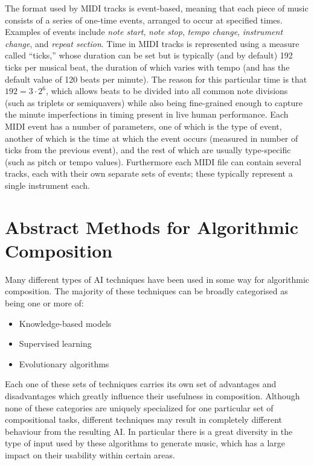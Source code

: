 \documentclass[ author={Stephen Livermore-Tozer},
				supervisor={Dr. Peter Flach},
				degree={MEng},
				title={Algorithmic Co-composition Using Machine Learning},
				subtitle={},
				type={research},
				year={2016} ]{dissertation}
\begin{document}
	
	The format used by MIDI tracks is event-based, meaning that each piece of music consists of a series of one-time events, arranged to occur at specified times. Examples of events include \textit{note start}, \textit{note stop}, \textit{tempo change}, \textit{instrument change}, and \textit{repeat section}. Time in MIDI tracks is represented using a measure called ``ticks,'' whose duration can be set but is typically (and by default) 192 ticks per musical beat, the duration of which varies with tempo (and has the default value of 120 beats per minute). The reason for this particular time is that $192 = 3 \cdot 2^6$, which allows beats to be divided into all common note divisions (such as triplets or semiquavers) while also being fine-grained enough to capture the minute imperfections in timing present in live human performance. Each MIDI event has a number of parameters, one of which is the type of event, another of which is the time at which the event occurs (measured in number of ticks from the previous event), and the rest of which are usually type-specific (such as pitch or tempo values). Furthermore each MIDI file can contain several tracks, each with their own separate sets of events; these typically represent a single instrument each. 
	
	\section{Abstract Methods for Algorithmic Composition}
	\label{sec:abstract-methods}
	
	Many different types of AI techniques have been used in some way for algorithmic composition. The majority of these techniques can be broadly categorised as being one or more of:
	\begin{itemize}
		\item Knowledge-based models
		\item Supervised learning
		\item Evolutionary algorithms
	\end{itemize}
	Each one of these sets of techniques carries its own set of advantages and disadvantages which greatly influence their usefulness in composition. Although none of these categories are uniquely specialized for one particular set of compositional tasks, different techniques may result in completely different behaviour from the resulting AI. In particular there is a great diversity in the type of input used by these algorithms to generate music, which has a large impact on their usability within certain areas.
	
\end{document}
